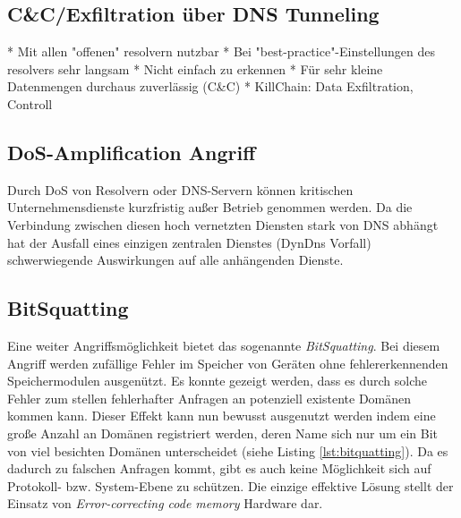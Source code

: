 \subsection{C\&C/Exfiltration über DNS Tunneling}


\begin{draft}
  \begin{markdown}
* Mit allen "offenen" resolvern nutzbar
* Bei "best-practice"-Einstellungen des resolvers sehr langsam
* Nicht einfach zu erkennen
* Für sehr kleine Datenmengen durchaus zuverlässig (C\&C)
* KillChain: Data Exfiltration, Controll
\end{markdown}
\end{draft}

\subsection{DoS-Amplification Angriff}
\label{sec:attack-dosamp}


\begin{draft}
Durch DoS von Resolvern oder DNS-Servern können kritischen Unternehmensdienste kurzfristig außer Betrieb genommen werden. Da die Verbindung zwischen diesen hoch vernetzten Diensten stark von DNS abhängt hat der Ausfall eines einzigen zentralen Dienstes (DynDns Vorfall) schwerwiegende Auswirkungen auf alle anhängenden Dienste.
\end{draft}


\subsection{BitSquatting}

Eine weiter Angriffsmöglichkeit bietet das sogenannte \textit{BitSquatting}. Bei diesem Angriff werden zufällige Fehler im Speicher von Geräten ohne fehlererkennenden Speichermodulen ausgenützt. Es konnte gezeigt werden, dass es durch solche Fehler zum stellen fehlerhafter Anfragen an potenziell existente Domänen kommen kann\cite{Dinaburg2011}. Dieser Effekt kann nun bewusst ausgenutzt werden indem eine große Anzahl an Domänen registriert werden, deren Name sich nur um ein Bit von viel besichten Domänen unterscheidet (siehe Listing \ref{lst:bitquatting}). Da es dadurch zu falschen Anfragen kommt, gibt es auch keine Möglichkeit sich auf Protokoll- bzw. System-Ebene zu schützen. Die einzige effektive Lösung stellt der Einsatz von \textit{Error-correcting code memory} Hardware dar.  

